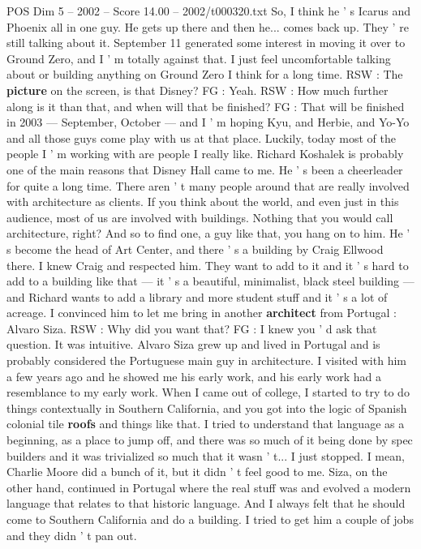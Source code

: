\begin{textsample}{POS Dim 5 – 2002 – Score 14.00 – 2002/t000320.txt}
So, I think he ' s Icarus and Phoenix all in one guy.
He gets up there and then he... comes back up.
They ' re still talking about it.
September 11 generated some interest in moving it over to Ground Zero, and I ' m totally against that.
I just feel uncomfortable talking about or building anything on Ground Zero I think for a long time.
RSW : The \textbf{picture} on the screen, is that Disney?
FG : Yeah.
RSW : How much further along is it than that, and when will that be finished?
FG : That will be finished in 2003 — September, October — and I ' m hoping Kyu, and Herbie, and Yo-Yo and all those guys come play with us at that place.
Luckily, today most of the people I ' m working with are people I really like.
Richard Koshalek is probably one of the main reasons that Disney Hall came to me.
He ' s been a cheerleader for quite a long time.
There aren ' t many people around that are really involved with architecture as clients.
If you think about the world, and even just in this audience, most of us are involved with buildings.
Nothing that you would call architecture, right?
And so to find one, a guy like that, you hang on to him.
He ' s become the head of Art Center, and there ' s a building by Craig Ellwood there.
I knew Craig and respected him.
They want to add to it and it ' s hard to add to a building like that — it ' s a beautiful, minimalist, black steel building — and Richard wants to add a library and more student stuff and it ' s a lot of acreage.
I convinced him to let me bring in another \textbf{architect} from Portugal : Alvaro Siza.
RSW : Why did you want that?
FG : I knew you ' d ask that question.
It was intuitive.
Alvaro Siza grew up and lived in Portugal and is probably considered the Portuguese main guy in architecture.
I visited with him a few years ago and he showed me his early work, and his early work had a resemblance to my early work.
When I came out of college, I started to try to do things contextually in Southern California, and you got into the logic of Spanish colonial tile \textbf{roofs} and things like that.
I tried to understand that language as a beginning, as a place to jump off, and there was so much of it being done by spec builders and it was trivialized so much that it wasn ' t...
I just stopped.
I mean, Charlie Moore did a bunch of it, but it didn ' t feel good to me.
Siza, on the other hand, continued in Portugal where the real stuff was and evolved a modern language that relates to that historic language.
And I always felt that he should come to Southern California and do a building.
I tried to get him a couple of jobs and they didn ' t pan out.

\end{textsample}
